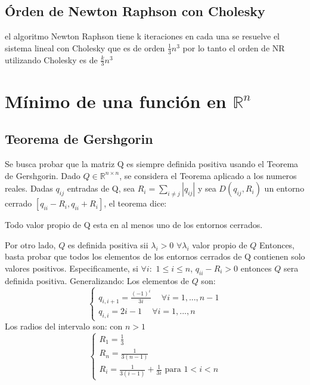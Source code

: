 \documentclass{endm}
\begin{document}
\subsection{Órden de Newton Raphson con Cholesky}
el algoritmo Newton Raphson tiene k iteraciones en cada una se resuelve el sistema lineal con Cholesky que es de orden $\frac{1}{3}n^{3}$  por lo tanto el orden de NR utilizando Cholesky es de  $\frac{k}{3}n^{3}$

\section{Mínimo de una función en $\mathbb{R}^n$}

\subsection{Teorema de Gershgorin}
Se busca probar que la matriz Q es siempre definida positiva usando el Teorema de Gershgorin.
Dado $Q \in \mathbb{R}^{n \times n}$, se considera el Teorema aplicado a los numeros reales.
Dadas $q_{ij}$ entradas de Q, sea $R_i = \sum_{i \neq j}\left | q_{ij} \right |$ y sea $D(q_{ij},R_i)$
un entorno cerrado $ [q_{ii}-R_i, q_{ii}+R_i]$, el teorema dice:
\begin{thm}
    Todo valor propio de Q esta en al menos uno de los entornos cerrados.
\end{thm}
Por otro lado, $Q$ es definida positiva sii $\lambda_i > 0$ $\forall \lambda_i$ valor propio de $Q$
Entonces, basta probar que todos los elementos de los entornos cerrados de Q contienen solo valores positivos.
Especificamente, si $\forall i:$ $1 \leq i \leq n$, $q_{ii} - R_i >0$ entonces $Q$ sera definida positiva.
Generalizando:
Los elementos de $Q$ son:
\begin{equation}
    \begin{cases}
        q_{i,i+1} = \frac{(-1)^i}{3i} \phantom{-} \forall i = 1,...,n-1 \\
        q_{i,i} = 2i-1 \phantom{-} \forall i = 1,...,n
    \end{cases}
\end{equation}
Los radios del intervalo son:
con $n > 1$
\begin{equation}
    \begin{cases}
        R_1 = \frac{1}{3} \\
        R_n = \frac{1}{3(n-1)} \\
        R_i = \frac{1}{3(i-1)} + \frac{1}{3i} \text{ para }  1<i<n
    \end{cases}
\end{equation}
\end{document}
